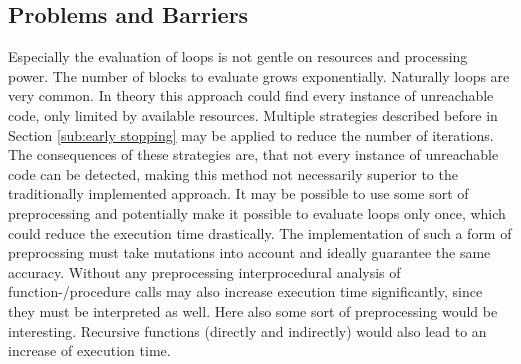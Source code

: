 \subsection{Problems and Barriers}
\label{sub:problems and barriers}
Especially the evaluation of loops is not gentle on resources and processing power. The number of blocks to evaluate grows exponentially. Naturally loops are very common. In theory this approach could find every instance of unreachable code, only limited by available resources. Multiple strategies described before in Section \ref{sub:early stopping} may be applied to reduce the number of iterations.
The consequences of these strategies are, that not every instance of unreachable code can be detected, making this method not necessarily superior to the traditionally implemented approach.
It may be possible to use some sort of preprocessing and potentially make it possible to evaluate loops only once, which could reduce the execution time drastically.
The implementation of such a form of preprocssing must take mutations into account and ideally guarantee the same accuracy.
Without any preprocessing interprocedural analysis of function-/procedure calls may also increase execution time significantly, since they must be interpreted as well. Here also some sort of preprocessing would be interesting. 
Recursive functions (directly and indirectly) would also lead to an increase of execution time.
